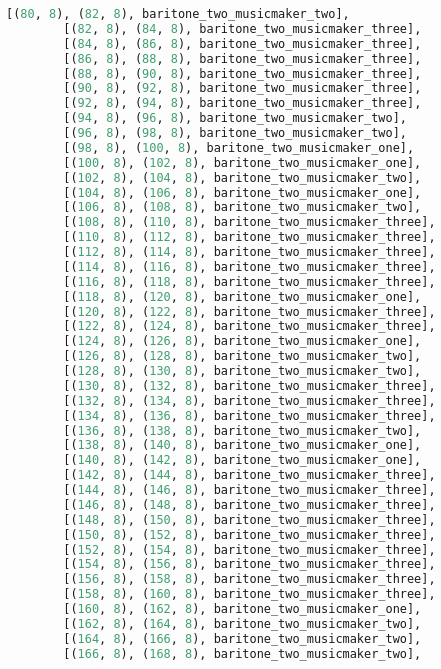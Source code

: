 \begin{lstlisting}[language=Python, caption=Invocation Source Code]
        [(80, 8), (82, 8), baritone_two_musicmaker_two],
        [(82, 8), (84, 8), baritone_two_musicmaker_three],
        [(84, 8), (86, 8), baritone_two_musicmaker_three],
        [(86, 8), (88, 8), baritone_two_musicmaker_three],
        [(88, 8), (90, 8), baritone_two_musicmaker_three],
        [(90, 8), (92, 8), baritone_two_musicmaker_three],
        [(92, 8), (94, 8), baritone_two_musicmaker_three],
        [(94, 8), (96, 8), baritone_two_musicmaker_two],
        [(96, 8), (98, 8), baritone_two_musicmaker_two],
        [(98, 8), (100, 8), baritone_two_musicmaker_one],
        [(100, 8), (102, 8), baritone_two_musicmaker_one],
        [(102, 8), (104, 8), baritone_two_musicmaker_two],
        [(104, 8), (106, 8), baritone_two_musicmaker_one],
        [(106, 8), (108, 8), baritone_two_musicmaker_two],
        [(108, 8), (110, 8), baritone_two_musicmaker_three],
        [(110, 8), (112, 8), baritone_two_musicmaker_three],
        [(112, 8), (114, 8), baritone_two_musicmaker_three],
        [(114, 8), (116, 8), baritone_two_musicmaker_three],
        [(116, 8), (118, 8), baritone_two_musicmaker_three],
        [(118, 8), (120, 8), baritone_two_musicmaker_one],
        [(120, 8), (122, 8), baritone_two_musicmaker_three],
        [(122, 8), (124, 8), baritone_two_musicmaker_three],
        [(124, 8), (126, 8), baritone_two_musicmaker_one],
        [(126, 8), (128, 8), baritone_two_musicmaker_two],
        [(128, 8), (130, 8), baritone_two_musicmaker_two],
        [(130, 8), (132, 8), baritone_two_musicmaker_three],
        [(132, 8), (134, 8), baritone_two_musicmaker_three],
        [(134, 8), (136, 8), baritone_two_musicmaker_three],
        [(136, 8), (138, 8), baritone_two_musicmaker_two],
        [(138, 8), (140, 8), baritone_two_musicmaker_one],
        [(140, 8), (142, 8), baritone_two_musicmaker_one],
        [(142, 8), (144, 8), baritone_two_musicmaker_three],
        [(144, 8), (146, 8), baritone_two_musicmaker_three],
        [(146, 8), (148, 8), baritone_two_musicmaker_three],
        [(148, 8), (150, 8), baritone_two_musicmaker_three],
        [(150, 8), (152, 8), baritone_two_musicmaker_three],
        [(152, 8), (154, 8), baritone_two_musicmaker_three],
        [(154, 8), (156, 8), baritone_two_musicmaker_three],
        [(156, 8), (158, 8), baritone_two_musicmaker_three],
        [(158, 8), (160, 8), baritone_two_musicmaker_three],
        [(160, 8), (162, 8), baritone_two_musicmaker_one],
        [(162, 8), (164, 8), baritone_two_musicmaker_two],
        [(164, 8), (166, 8), baritone_two_musicmaker_two],
        [(166, 8), (168, 8), baritone_two_musicmaker_two],

\end{lstlisting}
